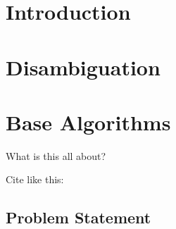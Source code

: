 \chapter{Introduction}


\chapter{Disambiguation}


\chapter{Base Algorithms}




What is this all about?

Cite like this: \cite{agarwal2011}

\section{Problem Statement}
